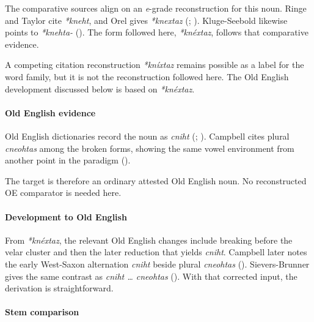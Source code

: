 \documentclass[
  british,
  a4paper,
]{article}
\begin{document}
The comparative sources align on an \emph{e}-grade reconstruction for
this noun. Ringe and Taylor cite \emph{*kneht}, and Orel gives
\emph{*knextaz} (; ). Kluge-Seebold likewise
points to \emph{*knehta-} (). The form followed here, \emph{*knéxtaz}, follows that comparative
evidence.

A competing citation reconstruction \emph{*kníxtaz} remains possible as
a label for the word family, but it is not the reconstruction followed
here. The Old English development discussed below is based on
\emph{*knéxtaz}.

\paragraph{Old English evidence}\label{old-english-evidence-13}

Old English dictionaries record the noun as \emph{cniht}
(;
).
Campbell cites plural \emph{cneohtas} among the broken forms, showing
the same vowel environment from another point in the paradigm
().

The target is therefore an ordinary attested Old English noun. No
reconstructed OE comparator is needed here.

\paragraph{Development to Old
English}\label{development-to-old-english-13}

From \emph{*knéxtaz}, the relevant Old English changes include breaking
before the velar cluster and then the later reduction that yields
\emph{cniht}. Campbell later notes the early West-Saxon alternation
\emph{cniht} beside plural \emph{cneohtas}
(). Sievers-Brunner
gives the same contrast as \emph{cniht \ldots{} cneohtas}
(). With that
corrected input, the derivation is straightforward.

\paragraph{Stem comparison}\label{stem-comparison-1}
\end{document}
